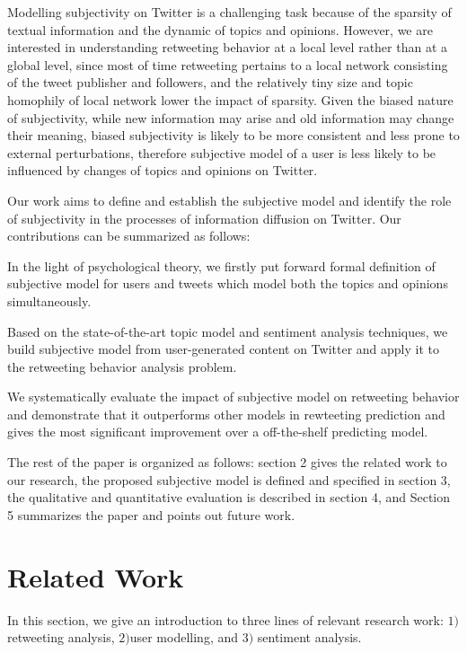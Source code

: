 \documentclass{acm_proc_article-sp}
\begin{document}
Modelling subjectivity on Twitter is a challenging task because of the sparsity of textual information and the dynamic of topics and opinions.
However, we are interested in understanding retweeting behavior at a local level rather than at a global level, since most of time retweeting pertains to a local network consisting of the tweet publisher and followers, and the relatively tiny size and topic homophily of local network lower the impact of sparsity.
Given the biased nature of subjectivity, while new information may arise and old information may change their meaning, biased subjectivity is likely to be more consistent and less prone to external perturbations, therefore subjective model of a user is less likely to be influenced by changes of topics and opinions on Twitter.
 
Our work aims to define and establish the subjective model and identify the role of subjectivity in the processes of information diffusion on Twitter. Our contributions can be summarized as follows:
\begin{itemize*}
\item In the light of psychological theory, we firstly put forward formal definition of subjective model for users and tweets which model both the topics and opinions simultaneously.
\item Based on the state-of-the-art topic model and sentiment analysis techniques, we build subjective model from user-generated content on Twitter and apply it to the retweeting behavior analysis problem.
\item We systematically evaluate the impact of subjective model on retweeting behavior and demonstrate that it outperforms other models in rewteeting prediction and gives the most significant improvement over a off-the-shelf predicting model. 
\end{itemize*}
The rest of the paper is organized as follows: section 2 gives the related work to our research, the proposed subjective model is defined and specified in section 3, the qualitative and quantitative evaluation is described in section 4, and Section 5 summarizes the paper and points out future work.

\section{Related Work}
\label{relatedwork}
In this section, we give an introduction to three lines of relevant research work: $ 1) $ retweeting analysis, $ 2) $user modelling, and $  3)$ sentiment analysis. 
\end{document}
